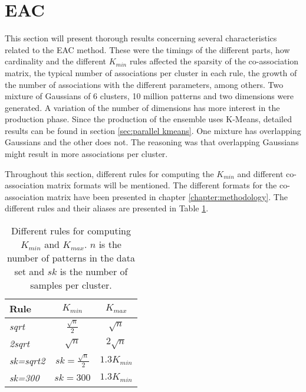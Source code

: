 \section{EAC}
\label{sec:eac results}

This section will present thorough results concerning several characteristics related to the EAC method.
These were the timings of the different parts, how cardinality and the different $K_{min}$ rules affected the sparsity of the co-association matrix, the typical number of associations per cluster in each rule, the growth of the number of associations with the different parameters, among others.
Two mixture of Gaussians of 6 clusters, 10 million patterns and two dimensions were generated.
A variation of the number of dimensions has more interest in the production phase.
Since the production of the ensemble uses K-Means, detailed results can be found in section \ref{sec:parallel kmeans}.
One mixture has overlapping Gaussians and the other does not.
The reasoning was that overlapping Gaussians might result in more associations per cluster.

Throughout this section, different rules for computing the $K_{min}$ and different co-association matrix formats will be mentioned.
The different formats for the co-association matrix have been presented in chapter \ref{chapter:methodology}.
The different rules and their aliases are presented in Table \ref{tab:eac rules}.

\begin{table}[h]
\centering
\caption{Different rules for computing $K_{min}$ and $K_{max}$. $n$ is the number of patterns in the data set and $sk$ is the number of samples per cluster.}

\begin{tabular}{lcc}
\toprule
Rule &  $K_{min}$ &  $K_{max}$ \\
\midrule
\emph{sqrt}     & $\frac{\sqrt{n}}{2}$      & $\sqrt{n}$    \\
\emph{2sqrt}    & $\sqrt{n}$                & $2 \sqrt{n}$  \\
\emph{sk=sqrt2} & $sk = \frac{\sqrt{n}}{2}$ & $1.3 K_{min}$ \\
\emph{sk=300}   & $sk = 300$                & $1.3 K_{min}$ \\
\bottomrule
\end{tabular}

\label{tab:eac rules}
\end{table}

